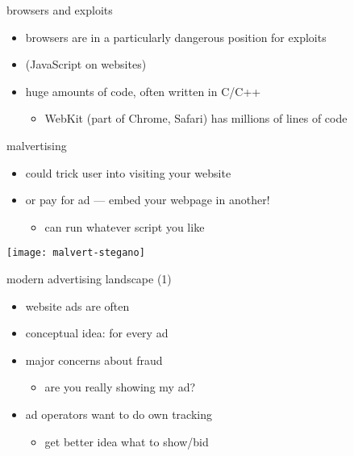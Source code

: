 \begin{frame}{browsers and exploits}
    \begin{itemize}
    \item browsers are in a particularly dangerous position for exploits
    \item {} (JavaScript on websites)
    \item huge amounts of code, often written in C/C++
        \begin{itemize}
            \item WebKit (part of Chrome, Safari) has millions of lines of code
        \end{itemize}
    \end{itemize}
\end{frame}

\begin{frame}{malvertising}
    \begin{itemize}
    \item could trick user into visiting your website
        \vspace{.5cm}
    \item or pay for ad --- embed your webpage in another!
        \begin{itemize}
        \item can run whatever script you like
        \end{itemize}
    \end{itemize}
    \texttt{[image: malvert-stegano]}
\end{frame}

\begin{frame}{modern advertising landscape (1)}
    \begin{itemize}
        \item website ads are often 
        \item conceptual idea: for every ad
        \item major concerns about fraud
            \begin{itemize}
            \item are you really showing my ad?
            \end{itemize}
        \item ad operators want to do own tracking
            \begin{itemize}
            \item get better idea what to show/bid
            \end{itemize}
    \end{itemize}
\end{frame}

